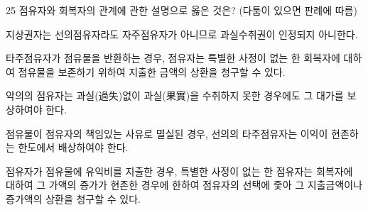 \begin{question}{25}
점유자와 회복자의 관계에 관한 설명으로 옳은 것은? (다툼이 있으면 판례에 따름)
\begin{choices}
  \item 지상권자는 선의점유자라도 자주점유자가 아니므로 과실수취권이 인정되지 아니한다.
  \item 타주점유자가 점유물을 반환하는 경우, 점유자는 특별한 사정이 없는 한 회복자에 대하여 점유물을 보존하기 위하여 지출한 금액의 상환을 청구할 수 있다.
  \item 악의의 점유자는 과실(過失)없이 과실(果實)을 수취하지 못한 경우에도 그 대가를 보상하여야 한다.
  \item 점유물이 점유자의 책임있는 사유로 멸실된 경우, 선의의 타주점유자는 이익이 현존하는 한도에서 배상하여야 한다.
  \item 점유자가 점유물에 유익비를 지출한 경우, 특별한 사정이 없는 한 점유자는 회복자에 대하여 그 가액의 증가가 현존한 경우에 한하여 점유자의 선택에 좇아 그 지출금액이나 증가액의 상환을 청구할 수 있다.
\end{choices}
\end{question}
